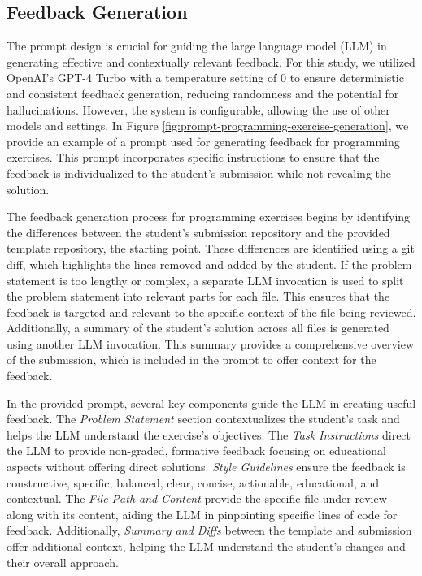 \documentclass[manuscript,screen,review]{acmart}
\begin{document}
\subsection{Feedback Generation}

The prompt design is crucial for guiding the large language model (LLM) in generating effective and contextually relevant feedback. For this study, we utilized OpenAI's GPT-4 Turbo with a temperature setting of 0 to ensure deterministic and consistent feedback generation, reducing randomness and the potential for hallucinations. However, the system is configurable, allowing the use of other models and settings. In Figure \ref{fig:prompt-programming-exercise-generation}, we provide an example of a prompt used for generating feedback for programming exercises. 
This prompt incorporates specific instructions to ensure that the feedback is individualized to the student's submission while not revealing the solution.

The feedback generation process for programming exercises begins by identifying the differences between the student's submission repository and the provided template repository, the starting point. 
These differences are identified using a git diff, which highlights the lines removed and added by the student. 
If the problem statement is too lengthy or complex, a separate LLM invocation is used to split the problem statement into relevant parts for each file. 
This ensures that the feedback is targeted and relevant to the specific context of the file being reviewed. 
Additionally, a summary of the student's solution across all files is generated using another LLM invocation. 
This summary provides a comprehensive overview of the submission, which is included in the prompt to offer context for the feedback.

In the provided prompt, several key components guide the LLM in creating useful feedback. The \textit{Problem Statement} section contextualizes the student's task and helps the LLM understand the exercise's objectives.
The \textit{Task Instructions} direct the LLM to provide non-graded, formative feedback focusing on educational aspects without offering direct solutions.
\textit{Style Guidelines} ensure the feedback is constructive, specific, balanced, clear, concise, actionable, educational, and contextual.
The \textit{File Path and Content} provide the specific file under review along with its content, aiding the LLM in pinpointing specific lines of code for feedback.
Additionally, \textit{Summary and Diffs} between the template and submission offer additional context, helping the LLM understand the student's changes and their overall approach.
\end{document}

